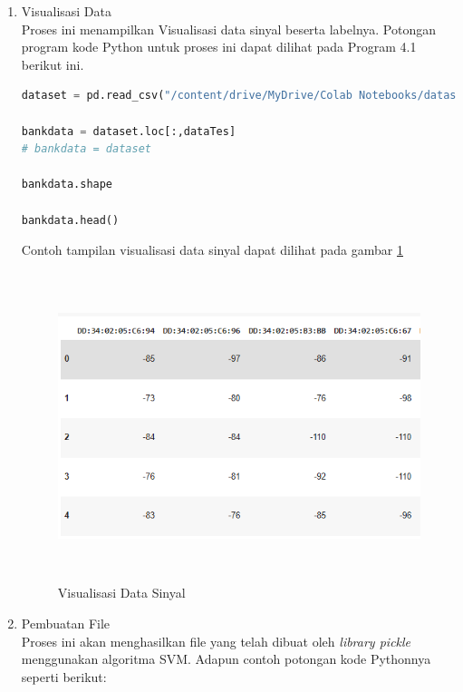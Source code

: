 \begin{enumerate} [1.]
	\item Visualisasi Data
	      \\ Proses ini menampilkan Visualisasi data sinyal beserta labelnya. Potongan program kode Python untuk proses ini dapat dilihat pada Program 4.1 berikut ini.
	      \\
	      \begin{lstlisting}[label=MinMAxdanPCA,language=Python]
dataset = pd.read_csv("/content/drive/MyDrive/Colab Notebooks/datasets.csv",",")

bankdata = dataset.loc[:,dataTes]
# bankdata = dataset

bankdata.shape

bankdata.head()
					\end{lstlisting}

	      \par Contoh tampilan visualisasi data sinyal dapat dilihat pada gambar \ref{bankdata}

	      \begin{figure}[H]
		      \centering
		      \includegraphics[width=14cm, height=9cm]{gambar/bankdata.PNG}
		      \caption{Visualisasi Data Sinyal}
		      \label{bankdata}
	      \end{figure}

	\item Pembuatan File
	      \\Proses ini akan menghasilkan file yang telah dibuat oleh \textit{library pickle} menggunakan algoritma SVM. Adapun contoh potongan kode Pythonnya seperti berikut:


\end{enumerate}
